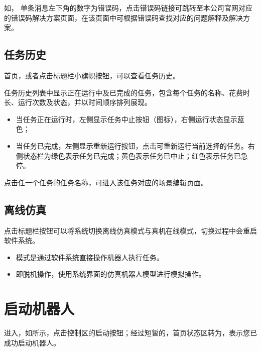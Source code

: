 如，
单条消息左下角的数字为错误码，点击错误码链接可跳转至本公司官网对应的错误码解决方案页面，在该页面中可根据错误码查找对应的问题解释及解决方案。

\subsection{任务历史}
\label{sec:任务历史}
\LM 首页，或者点击标题栏小旗帜按钮，可以查看任务历史。

任务历史列表中显示正在运行中及已完成的任务，包含每个任务的名称、花费时长、运行次数及状态，并以时间顺序排列展现。

\begin{itemize}
	\item 当任务正在运行时，左侧显示任务中止按钮（图标），右侧运行状态显示蓝色； 
	\item 当任务已完成，左侧显示重新运行按钮，点击可重新运行当前选择的任务。右侧状态栏为绿色表示任务已完成；黄色表示任务已中止；红色表示任务已急停。
\end{itemize}

点击任一个任务的任务名称，可进入该任务对应的场景编辑页面。


\subsection{离线仿真}

点击标题栏按钮可以将系统切换离线仿真模式与真机在线模式，切换过程中会重启软件系统。

\begin{itemize}
\item {}模式是通过软件系统直接操作机器人执行任务。
\item {}即脱机操作，使用系统界面的仿真机器人模型进行模拟操作。
\end{itemize}


\section{启动机器人}
进入\LM ，如所示，点击控制区的启动按钮；经过短暂的，首页状态区转为，表示您已成功启动机器人。

